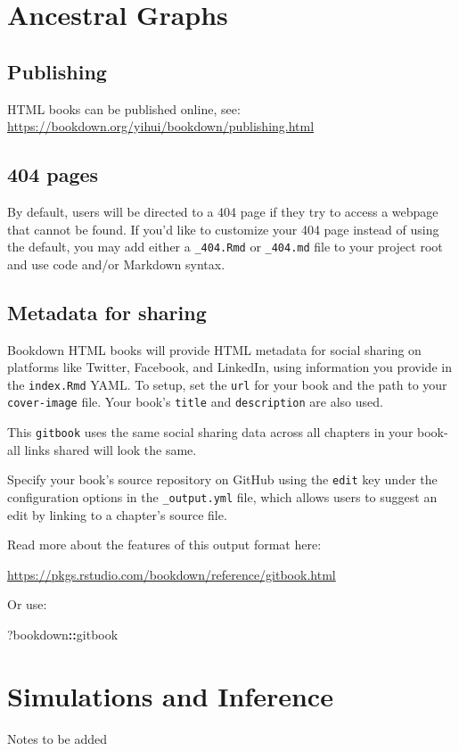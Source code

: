 \documentclass[
]{book}
\newenvironment{Shaded}{\begin{snugshade}}{\end{snugshade}}
\newcommand{\NormalTok}[1]{#1}
\newcommand{\SpecialCharTok}[1]{\textcolor[rgb]{0.81,0.36,0.00}{\textbf{#1}}}
\theoremstyle{definition}
\theoremstyle{definition}
\theoremstyle{definition}
\theoremstyle{definition}
\theoremstyle{remark}
\begin{document}
\hypertarget{ancestral-graphs}{%
\chapter{Ancestral Graphs}\label{ancestral-graphs}}

\hypertarget{publishing}{%
\section{Publishing}\label{publishing}}

HTML books can be published online, see: \url{https://bookdown.org/yihui/bookdown/publishing.html}

\hypertarget{pages}{%
\section{404 pages}\label{pages}}

By default, users will be directed to a 404 page if they try to access a webpage that cannot be found. If you'd like to customize your 404 page instead of using the default, you may add either a \texttt{\_404.Rmd} or \texttt{\_404.md} file to your project root and use code and/or Markdown syntax.

\hypertarget{metadata-for-sharing}{%
\section{Metadata for sharing}\label{metadata-for-sharing}}

Bookdown HTML books will provide HTML metadata for social sharing on platforms like Twitter, Facebook, and LinkedIn, using information you provide in the \texttt{index.Rmd} YAML. To setup, set the \texttt{url} for your book and the path to your \texttt{cover-image} file. Your book's \texttt{title} and \texttt{description} are also used.

This \texttt{gitbook} uses the same social sharing data across all chapters in your book- all links shared will look the same.

Specify your book's source repository on GitHub using the \texttt{edit} key under the configuration options in the \texttt{\_output.yml} file, which allows users to suggest an edit by linking to a chapter's source file.

Read more about the features of this output format here:

\url{https://pkgs.rstudio.com/bookdown/reference/gitbook.html}

Or use:

\begin{Shaded}
\begin{Highlighting}[]
\NormalTok{?bookdown}\SpecialCharTok{::}\NormalTok{gitbook}
\end{Highlighting}
\end{Shaded}

\hypertarget{simulations-and-inference}{%
\chapter{Simulations and Inference}\label{simulations-and-inference}}

Notes to be added

  
\end{document}
